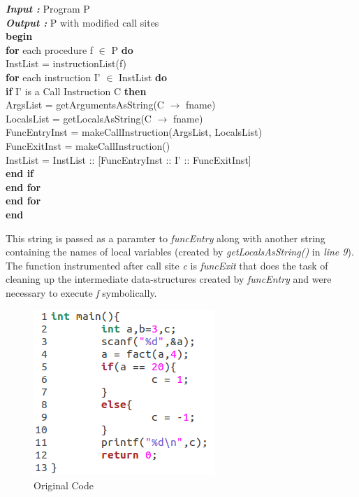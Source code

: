\documentclass[12pt,oneside]{book}
\begin{document}
\noindent
\textbf{\textit{Input :}} Program P\\
\textbf{\textit{Output :}} P with modified call sites\\
\textbf{begin}\\
\linenumbers
\textbf{for} each procedure f $\in$ P \textbf{do}\\
\hspace*{2mm} InstList = instructionList(f)\\
\hspace*{3mm}\textbf{for} each instruction I' $\in$ InstList \textbf{do}\\
\hspace*{7mm}\textbf{if} I' is a Call Instruction C \textbf{then}\\
\hspace*{11mm}ArgsList = getArgumentsAsString(C $\rightarrow$ fname)\\
\hspace*{11mm}LocalsList = getLocalsAsString(C $\rightarrow$ fname)\\
\hspace*{11mm}FuncEntryInst = makeCallInstruction(ArgsList, LocalsList)\\
\hspace*{11mm}FuncExitInst = makeCallInstruction()\\
\hspace*{11mm}InstList = InstList :: [FuncEntryInst :: I' :: FuncExitInst]\\
\hspace*{7mm}\textbf{end if}\\
\hspace*{3mm}\textbf{end for}\\
\textbf{end for}\\
\textbf{end}

\nolinenumbers
\noindent

\vspace{0.4cm}
This string is passed as a paramter to \textit{funcEntry} along with another string containing the names of local variables (created by \textit{getLocalsAsString()} in \textit{line 9}). The function instrumented after call site \textit{c} is \textit{funcExit} that does the task of cleaning up the intermediate data-structures created by \textit{funcEntry} and were necessary to execute \textit{f} symbolically.

\begin{figure}[htbp]
\centering
\includegraphics[scale=0.53]{env1_orig.png}
\caption{Original Code}
\end{figure}  
\end{document}
